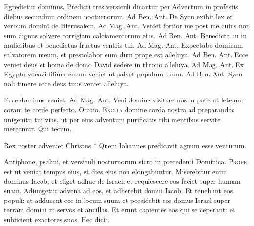 \begin{multicols*}{2}
 \V Egredietur dominus. 
\newline \ul{Predicti tres versiculi dicantur per Adventum in profestis diebus secundum ordinem nocturnorum.} {\color{Red} Ad Ben. Ant.} De Syon exibit lex et verbum domini de Hierusalem. {\color{Red} Ad Mag. Ant.} Veniet fortior me post me cuius non sum dignus solvere corrigiam calciamentorum eius.
 {\color{Red} Ad Ben. Ant.} Benedicta tu in mulieribus et benedictus fructus ventris tui. {\color{Red} Ad Mag. Ant.} Expectabo dominum salvatorem meum, et prestolabor eum dum prope est alleluya.
 {\color{Red} Ad Ben. Ant.} Ecce veniet deus et homo de domo David sedere in throno alleluya. {\color{Red} Ad Mag. Ant.} Ex Egypto vocavi filium emum veniet ut salvet populum suum.
 {\color{Red} Ad Ben. Ant.} Syon noli timere ecce deus tuus veniet alleluya.
{\color{Red} }
\par {} \R \hyperlink{ecce-dominus-veniet}{Ecce dominus veniet}, {\color{Red} Ad Mag. Ant.} Veni domine visitare nos in pace ut letemur coram te corde perfecto. {\color{Red} Oratio.}
\lettrine[lines=2]{\zallmancaps \color{Red} E}{xcita} domine corda nostra ad preparandas unigenitu tui vias, ut per eius adventum purificatis tibi mentibus servite mereamur. Qui tecum.
\begin{invitatory}
{Rex noster adveniet Christus * Quem Iohannes predicavit agnum esse venturum.}
\end{invitatory}
\newline \ul{Antiphone, psalmi, et versiculi nocturnorum sicut in precedenti Dominica.}
\lettrine[lines=2]{\zallmancaps \color{Blue} P}{rope} est ut veniat tempus eius, et dies eius non elongabuntur. Miserebitur enim dominus Iacob, et eliget adhuc de Israel, et requiescere eos faciet super humum suam. Adiungetur advena ad eos, et adherebit domui Iacob. Et tenebunt eos populi: et adducent eos in locum suum et possidebit eos domus Israel super terram domini in servos et ancillas. Et erunt capientes eos qui se ceperant: et subiicient exactores suos. Hec dicit.

\end{multicols*}
